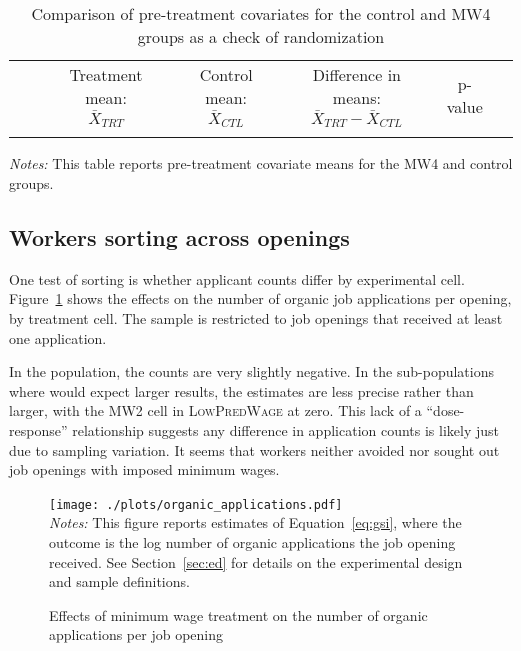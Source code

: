\documentclass[AER]{AEA}
\newcommand{\lpw}{\textsc{LowPredWage}}
\begin{document}
\begin{table}
\begin{center}
\caption{Comparison of pre-treatment covariates for the control and MW4 groups as a check of randomization \label{tab:randomization_check}}
\begin{small}
\begin{tabular}{lllcccc}
\toprule
& & \multicolumn{1}{c}{\parbox[t][][t]{2cm}{Treatment mean:\\ $\bar{X}_{TRT}$}}
& \multicolumn{1}{c}{\parbox[t][][t]{2cm}{Control mean:\\ $\bar{X}_{CTL}$}}
& \multicolumn{1}{c}{\parbox[t][][t]{2cm}{Difference in means: \\ $\bar{X}_{TRT} - \bar{X}_{CTL}$}}
& \multicolumn{1}{c}{\parbox[b][][b]{2cm}{ p-value }} \\
\\
\hline
  
 \end{tabular}
\end{small}
\end{center}
\singlespace
\begin{footnotesize}
  \emph{Notes:} This table reports pre-treatment covariate means for the MW4 and control groups. 
\end{footnotesize}
\end{table}

\subsection{Workers sorting across openings}  \label{sec:workers_sorting} 
One test of sorting is whether applicant counts differ by experimental cell.
Figure~\ref{fig:all_new_organic_applications} shows the effects on the number of organic job applications per opening, by treatment cell. 
The sample is restricted to job openings that received at least one application.  

In the population, the counts are very slightly negative.
In the sub-populations where would expect larger results, the estimates are less precise rather than larger, with the MW2 cell in \lpw{} at zero.
This lack of a ``dose-response'' relationship suggests any difference in application counts is likely just due to sampling variation.
It seems that workers neither avoided nor sought out job openings with imposed minimum wages.  

\begin{figure}[h!]
  \caption{Effects of minimum wage treatment on the number of organic applications per job opening} \label{fig:all_new_organic_applications}
  \centering
  \begin{minipage}{0.99\textwidth}
    \texttt{[image: ./plots/organic\_applications.pdf]}
{\footnotesize \\
  \emph{Notes:} This figure reports estimates of Equation~\ref{eq:gsi}, where the outcome is the log number of organic applications the job opening received. 
  See Section~\ref{sec:ed} for details on the experimental design and sample definitions.  
}
\end{minipage} 
\end{figure}
\end{document}

